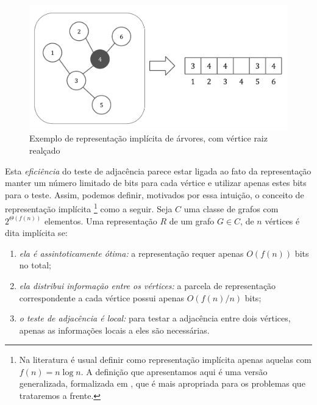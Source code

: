 \begin{figure}[!htbp]
  \centering
  \includegraphics[scale=0.6]{figures/graphs1.pdf}
  \caption{Exemplo de representação implícita de árvores, com vértice raiz realçado}
  \label{fig:graphs1}
\end{figure}

Esta \emph{eficiência} do teste de adjacência parece estar ligada ao fato da representação manter um número limitado de bits para cada vértice e utilizar apenas estes bits para o teste. Assim, podemos definir, motivados por essa intuição, o conceito de representação implícita \footnote{Na literatura é usual definir como representação implícita apenas aquelas com $f(n) = n \log n$. A definição que apresentamos aqui é uma versão generalizada, formalizada em \cite{spinrad2003efficient}, que é mais apropriada para os problemas que trataremos a frente.} como a seguir. Seja $C$ uma classe de grafos com $2^{\Theta(f(n))}$ elementos. Uma representação $R$ de um grafo $G \in C$, de $n$ vértices é dita implícita se:
\begin{enumerate}  
\item \emph{ela é assintoticamente ótima:} a representação requer apenas $O(f(n))$ bits no total;
\item \emph{ela distribui informação entre os vértices:} a parcela de representação correspondente a cada vértice possui apenas $O(f(n)/n)$ bits;
\item \emph{o teste de adjacência é local:} para testar a adjacência entre dois vértices, apenas as informações locais a eles são necessárias.
\end{enumerate}

